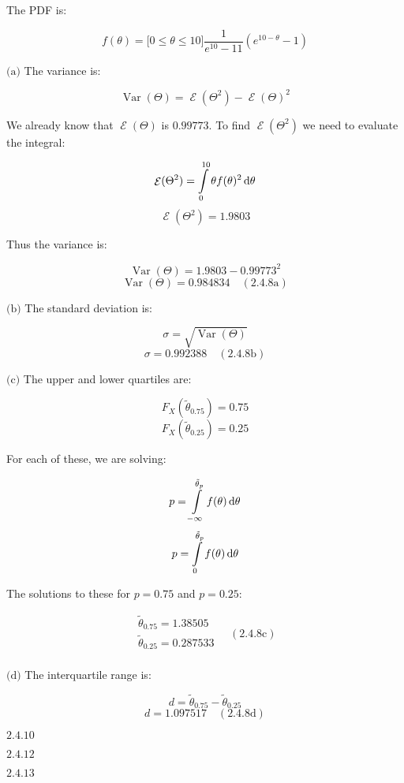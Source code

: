 \documentclass{article}
\newcommand{\problem}[2]{$\boxed{\text{#1.#2}}$}
\newcommand{\subproblem}[3]{$\boxed{\text{(#3)}}$}
\newcommand{\subsolution}[4]{\boxed{#4\quad(\text{#1.#2#3})}}
\renewcommand{\d}[1]{\,\textnormal{d}#1}
\DeclareMathOperator{\var}{Var}
\DeclareMathOperator{\E}{\mathcal{E}}
\begin{document}
The PDF is:

\[
f(\theta)=\lbrack0\le\theta\le10\rbrack \frac{1}{e^{10}-11}\left(e^{10-\theta}-1\right)
\]

%
\subproblem{2.4}{8}{a} The variance is:

\[
\var(\Theta)=\E(\Theta^2)-\E(\Theta)^2
\]

We already know that $\E(\Theta)$ is $0.99773$. To find $\E(\Theta^2)$
we need to evaluate the integral:

\[
\E(\Theta^2)=\int\limits_{0}^{10} \theta f(\theta)^2 \d{\theta}
\] \[
\E(\Theta^2)=1.9803
\]

Thus the variance is:

\[
\var(\Theta)=1.9803-0.99773^2
\] \[
\subsolution{2.4}{8}{a}{\var(\Theta)=0.984834}
\]

%
\subproblem{2.4}{8}{b} The standard deviation is:

\[
\sigma=\sqrt{\var(\Theta)}
\] \[
\subsolution{2.4}{8}{b}{\sigma=0.992388}
\]

%
\subproblem{2.4}{8}{c} The upper and lower quartiles are:

\[
F_X(\tilde{\theta}_{0.75})=0.75
\] \[
F_X(\tilde{\theta}_{0.25})=0.25
\]

For each of these, we are solving:

\[
p=\int\limits_{-\infty}^{\tilde{\theta}_p} f(\theta)\d{\theta}
\] \[
p=\int\limits_{0}^{\tilde{\theta}_p} f(\theta)\d{\theta}
\]

The solutions to these for $p=0.75$ and $p=0.25$:

\[
\subsolution{2.4}{8}{c}{\begin{array}{l}
\tilde{\theta}_{0.75}=1.38505 \\
\tilde{\theta}_{0.25}=0.287533 \\
\end{array}}
\]

%
\subproblem{2.4}{8}{d} The interquartile range is:

\[
d=\tilde{\theta}_{0.75}-\tilde{\theta}_{0.25}
\] \[
\subsolution{2.4}{8}{d}{d=1.097517}
\]

%
\problem{2.4}{10}

%
\problem{2.4}{12}

%
\problem{2.4}{13}
\end{document}

